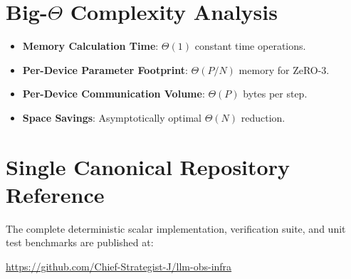\documentclass[11pt,a4paper]{article}
\theoremstyle{definition}
\begin{document}
\section{Big-$\Theta$ Complexity Analysis}

\begin{itemize}
    \item \textbf{Memory Calculation Time}: $\Theta(1)$ constant time operations.
    \item \textbf{Per-Device Parameter Footprint}: $\Theta(P / N)$ memory for ZeRO-3.
    \item \textbf{Per-Device Communication Volume}: $\Theta(P)$ bytes per step.
    \item \textbf{Space Savings}: Asymptotically optimal $\Theta(N)$ reduction.
\end{itemize}

\section{Single Canonical Repository Reference}

The complete deterministic scalar implementation, verification suite, and unit test benchmarks are published at:
\begin{center}
\url{https://github.com/Chief-Strategist-J/llm-obs-infra}
\end{center}
\end{document}
